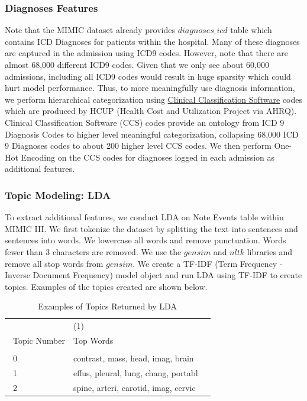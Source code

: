 \documentclass[12pt, final]{article}
\begin{document}
\subsubsection{Diagnoses Features}
Note that the MIMIC dataset already provides $diagnoses\_icd$ table which contains ICD Diagnoses for patients within the hospital. Many of these diagnoses are captured in the admission using ICD9 codes. However, note that there are almost 68,000 different ICD9 codes. Given that we only see about 60,000 admissions, including all ICD9 codes would result in huge sparsity which could hurt model performance. Thus, to more meaningfully use diagnosis information, we perform hierarchical categorization using \href{https://www.hcup-us.ahrq.gov/toolssoftware/ccs/ccs.jsp}{Clinical Classification Software} codes which are produced by HCUP (Health Cost and Utilization Project via AHRQ). Clinical Classification Software (CCS) codes provide an ontology from ICD 9 Diagnosis Codes to higher level meaningful categorization, collapsing 68,000 ICD 9 Diagnoses codes to about 200 higher level CCS codes. We then perform One-Hot Encoding on the CCS codes for diagnoses logged in each admission as additional features.

\subsubsection{Topic Modeling: LDA}
To extract additional features, we conduct LDA on Note Events table within MIMIC III. We first tokenize the dataset by splitting the text into sentences and sentences into words. We lowercase all words and remove punctuation. Words fewer than 3 characters are removed. We use the $gensim$ and $nltk$ libraries and remove all stop words from $gensim$. We create a TF-IDF (Term Frequency - Inverse Document Frequency) model object and run LDA using TF-IDF to create topics. Examples of the topics created are shown below.

\begin{table}[H]
\footnotesize
{}%
\caption{Examples of Topics Returned by LDA}
\label{LDA}
\centering
\begin{tabularx}{\textwidth}{l C C}\hline
 & (1) \\\
Topic Number & Top Words \\ \hline
 &    \\\
0 & contrast, mass, head, imag, brain  \\\
1 & effus, pleural, lung, chang, portabl \\\
2 & spine, arteri, carotid, imag, cervic
\end{tabularx}
\end{table}
\end{document}
